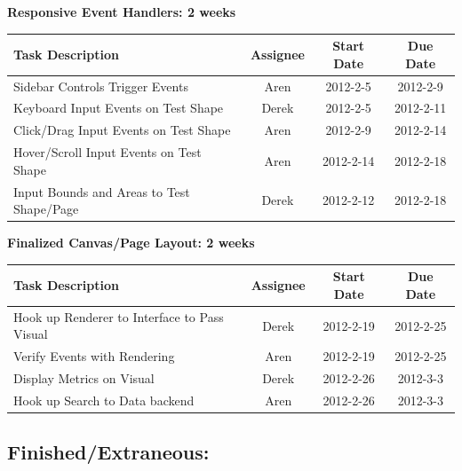 \documentclass[12pt, letterpaper]{article}
\begin{document}
  \begin{center}
		{\bf Responsive Event Handlers: 2 weeks}
    \begin{tabular}{| l || c | c | c | }
      \hline
      Task Description & Assignee & Start Date & Due Date \\
      \hline
 	    Sidebar Controls Trigger Events & Aren & 2012-2-5 & 2012-2-9 \\
	    Keyboard Input Events on Test Shape & Derek & 2012-2-5 & 2012-2-11 \\
	    Click/Drag Input Events on Test Shape & Aren & 2012-2-9 & 2012-2-14 \\
	    Hover/Scroll Input Events on Test Shape & Aren & 2012-2-14 & 2012-2-18 \\
	    Input Bounds and Areas to Test Shape/Page & Derek & 2012-2-12 & 2012-2-18 \\
      \hline
    \end{tabular}
  \end{center}

  \begin{center}
		{\bf Finalized Canvas/Page Layout: 2 weeks}
    \begin{tabular}{| l || c | c | c | }
      \hline
      Task Description & Assignee & Start Date & Due Date \\
      \hline
	    Hook up Renderer to Interface to Pass Visual & Derek & 2012-2-19 & 2012-2-25 \\
	    Verify Events with Rendering & Aren & 2012-2-19 & 2012-2-25 \\
	    Display Metrics on Visual & Derek & 2012-2-26 & 2012-3-3 \\
	    Hook up Search to Data backend & Aren & 2012-2-26 & 2012-3-3 \\
      \hline
    \end{tabular}
  \end{center}

	\subsection{Finished/Extraneous:}
\end{document}
